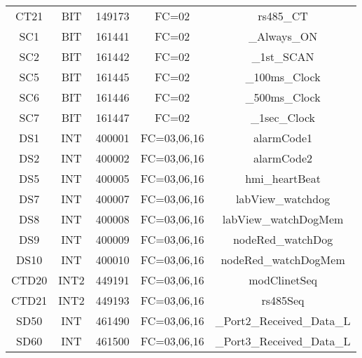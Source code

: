 \begin{center}
\begin{longtable}[c]{ |c|c|c|c|c| }
        CT21	&	BIT	&	149173	&	FC=02	&	rs485\_CT\\
        SC1	&	BIT	&	161441	&	FC=02	&	\_Always\_ON\\
        SC2	&	BIT	&	161442	&	FC=02	&	\_1st\_SCAN\\
        SC5	&	BIT	&	161445	&	FC=02	&	\_100ms\_Clock\\
        SC6	&	BIT	&	161446	&	FC=02	&	\_500ms\_Clock\\
        SC7	&	BIT	&	161447	&	FC=02	&	\_1sec\_Clock\\
        DS1	&	INT	&	400001	&	FC=03,06,16	&	alarmCode1\\
        DS2	&	INT	&	400002	&	FC=03,06,16	&	alarmCode2\\
        DS5	&	INT	&	400005	&	FC=03,06,16	&	hmi\_heartBeat\\
        DS7	&	INT	&	400007	&	FC=03,06,16	&	labView\_watchdog\\
        DS8	&	INT	&	400008	&	FC=03,06,16	&	labView\_watchDogMem\\
        DS9	&	INT	&	400009	&	FC=03,06,16	&	nodeRed\_watchDog\\
        DS10	&	INT	&	400010	&	FC=03,06,16	&	nodeRed\_watchDogMem\\
        CTD20	&	INT2	&	449191	&	FC=03,06,16	&	modClinetSeq\\
        CTD21	&	INT2	&	449193	&	FC=03,06,16	&	rs485Seq\\
        SD50	&	INT	&	461490	&	FC=03,06,16	&	\_Port2\_Received\_Data\_L\\
        SD60	&	INT	&	461500	&	FC=03,06,16	&	\_Port3\_Received\_Data\_L\\
        \hline
    \end{longtable}
\end{center}
\label{table:modbusRegister}